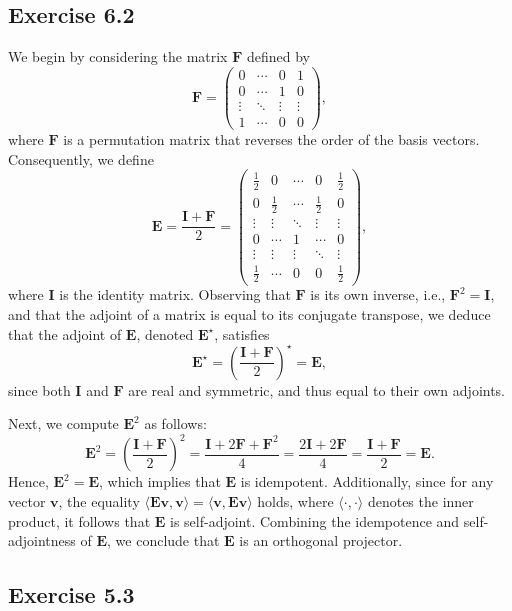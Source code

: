 \documentclass{article}
\begin{document}
\subsection{Exercise 6.2}
We begin by considering the matrix \(\bm{F}\) defined by
\[
\bm{F} =
\begin{pmatrix}
	0 & \cdots & 0 & 1 \\
	0 & \cdots & 1 & 0 \\
	\vdots & \ddots & \vdots & \vdots \\
	1 & \cdots & 0 & 0
\end{pmatrix},
\]
where \(\bm{F}\) is a permutation matrix that reverses the order of the basis vectors. Consequently, we define
\[
\bm{E} = \frac{\bm{I} + \bm{F}}{2} = 
\begin{pmatrix}
	\frac{1}{2} & 0 & \cdots & 0 & \frac{1}{2} \\
	0 & \frac{1}{2} & \cdots & \frac{1}{2} & 0 \\
	\vdots & \vdots & \ddots & \vdots & \vdots \\
	0 & \cdots & 1 & \cdots & 0 \\
	\vdots & \vdots & \vdots & \ddots & \vdots \\
	\frac{1}{2} & \cdots & 0 & 0 & \frac{1}{2}
\end{pmatrix},
\]
where \(\bm{I}\) is the identity matrix. Observing that \(\bm{F}\) is its own inverse, i.e., \(\bm{F}^2 = \bm{I}\), and that the adjoint of a matrix is equal to its conjugate transpose, we deduce that the adjoint of \(\bm{E}\), denoted \(\bm{E}^\star\), satisfies
\[
\bm{E}^\star = \left(\frac{\bm{I} + \bm{F}}{2}\right)^\star = \bm{E},
\]
since both \(\bm{I}\) and \(\bm{F}\) are real and symmetric, and thus equal to their own adjoints.

Next, we compute \(\bm{E}^2\) as follows:
\[
\bm{E}^2 = \left(\frac{\bm{I} + \bm{F}}{2}\right)^2 = \frac{\bm{I} + 2\bm{F} + \bm{F}^2}{4} = \frac{2\bm{I} + 2\bm{F}}{4} = \frac{\bm{I} + \bm{F}}{2} = \bm{E}.
\]
Hence, \(\bm{E}^2 = \bm{E}\), which implies that \(\bm{E}\) is idempotent. Additionally, since for any vector \(\bm{v}\), the equality \(\langle \bm{E}\bm{v}, \bm{v} \rangle = \langle \bm{v}, \bm{E}\bm{v} \rangle\) holds, where \(\langle \cdot, \cdot \rangle\) denotes the inner product, it follows that \(\bm{E}\) is self-adjoint. Combining the idempotence and self-adjointness of \(\bm{E}\), we conclude that \(\bm{E}\) is an orthogonal projector.

\subsection{Exercise 5.3}
\end{document}
